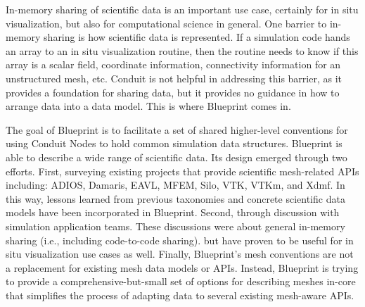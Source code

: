 
%
In-memory sharing of scientific data is an important use case,
certainly for in situ visualization, but also for computational science in general.
%
One barrier to in-memory sharing is how scientific data is represented.
%
If a simulation code hands an array to an in situ visualization routine, then the routine
needs to know if this array is a scalar field, coordinate information, connectivity information
for an unstructured mesh, etc.
%
Conduit is not helpful in addressing this barrier, 
as it provides a foundation for sharing data, but it provides no guidance in how to arrange
data into a data model.
%
This is where Blueprint comes in.
%
%


The goal of Blueprint is to facilitate a set of shared higher-level
conventions for using Conduit Nodes to hold common simulation data structures.
%
Blueprint is able to describe a wide range of scientific data.
%
Its design emerged through two efforts.
%
First,  surveying existing
projects that provide scientific mesh-related APIs including: ADIOS, Damaris,
EAVL, MFEM, Silo, VTK, VTKm, and Xdmf. 
%
In this way, lessons learned from previous taxonomies and concrete scientific data models
have been incorporated in Blueprint.
%
Second, through discussion with simulation application teams.
%
These discussions were about general in-memory sharing (i.e., including code-to-code sharing).
but have proven to be useful for in situ visualization use cases as well.
%
Finally,
Blueprint's mesh conventions are not a replacement for existing mesh data models or APIs. 
%
Instead, Blueprint is trying to provide a comprehensive-but-small set of options for 
describing meshes in-core that simplifies 
the process of adapting data to several existing mesh-aware APIs.



%
%

